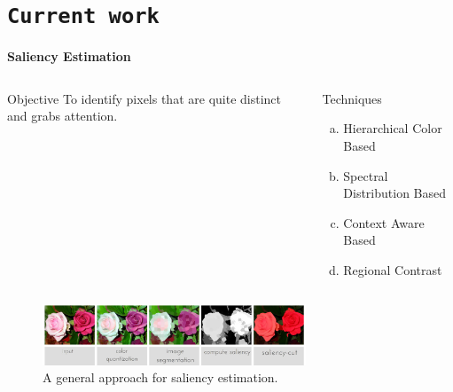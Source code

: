 \section{\texttt{Current work}}
\begin{frame}{\textbf{Saliency Estimation}}
\begin{columns}
	\begin{column}{0.48\textwidth}
		\begin{varblock}[\textwidth]{Objective}
			To identify pixels that are quite distinct and grabs attention.
		\end{varblock}
	\end{column}
	\begin{column}{0.48\textwidth}
	\begin{varblock}[\textwidth]{Techniques}
		\footnotesize
		\begin{multicols}{2}
		\begin{enumerate}[(a)]
    			\item Hierarchical Color Based
    			\item Spectral Distribution Based
		    \item Context Aware Based
    			\item Regional Contrast
		\end{enumerate}
		\end{multicols}			
	\end{varblock}
	\end{column}
\end{columns}
	\begin{figure}
		\centering
		\includegraphics[width=0.7\textwidth]{./img/saliency.eps}
		\caption{A general approach for saliency estimation.}
	\end{figure}
\end{frame}

